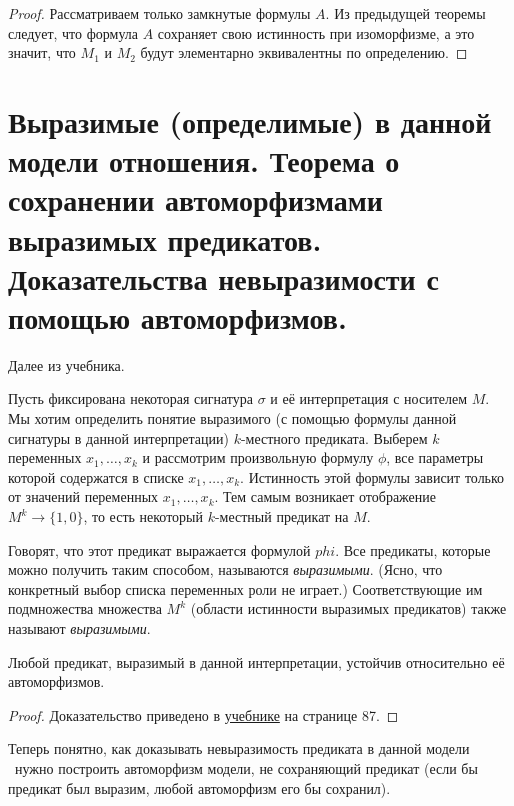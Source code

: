 \documentclass{article}
\begin{document}
\begin{proof}
    Рассматриваем только замкнутые формулы $A$. Из предыдущей теоремы следует, что формула $A$ сохраняет свою истинность при изоморфизме, а это значит, что $M_1$ и $M_2$ будут элементарно эквивалентны по определению.
\end{proof}

\setcounter{section}{23}

\section{Выразимые (определимые) в данной модели отношения. Теорема о сохранении автоморфизмами выразимых предикатов. Доказательства невыразимости с помощью автоморфизмов.}

Далее из учебника.

Пусть фиксирована некоторая сигнатура $\sigma$ и её интерпретация с носителем $M$. Мы хотим определить понятие выразимого (с помощью формулы данной сигнатуры в данной интерпретации) $k$-местного предиката.
Выберем $k$ переменных $x_1, \dots, x_k$ и рассмотрим произвольную формулу $\phi$, все параметры которой содержатся в списке $x_1, \dots, x_k$. Истинность этой формулы зависит только от значений переменных $x_1, \dots, x_k$. Тем самым возникает отображение $M^k \rightarrow \{1, 0\}$, то есть некоторый $k$-местный предикат на $M$.

Говорят, что этот предикат выражается формулой $phi$. Все предикаты, которые можно получить таким способом, называются \textit{выразимыми}. (Ясно, что конкретный выбор списка переменных роли не играет.) Соответствующие им подмножества множества $M^k$ (области истинности выразимых предикатов) также называют \textit{выразимыми}.


\begin{theorem}
	Любой предикат, выразимый в данной интерпретации, устойчив относительно её автоморфизмов.
\end{theorem}

\begin{proof}
	Доказательство приведено в \href{https://www.mccme.ru/free-books/shen/shen-logic-part2-2.pdf}{учебнике} на странице 87.
\end{proof}

Теперь понятно, как доказывать невыразимость предиката в данной модели \textemdash\ нужно построить автоморфизм модели, не сохраняющий предикат (если бы предикат был выразим, любой автоморфизм его бы сохранил).

\setcounter{section}{24}
\end{document}
